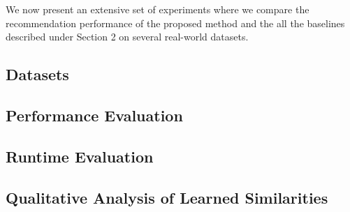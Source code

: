 We now present an extensive set of experiments
where we compare the recommendation performance of the proposed method and the all the baselines described under Section 2 on several real-world datasets.
\subsection{Datasets}


\subsection{Performance Evaluation}


\subsection{Runtime Evaluation}
\label{section:scalability}


\subsection{Qualitative Analysis of Learned Similarities}

